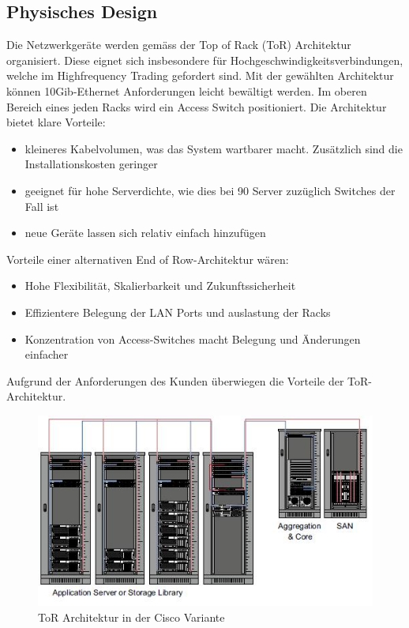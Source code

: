 \subsection{Physisches Design}
Die Netzwerkgeräte werden gemäss der Top of Rack (ToR) Architektur organisiert. Diese eignet sich insbesondere für Hochgeschwindigkeitsverbindungen, welche im Highfrequency Trading gefordert sind. Mit der gewählten Architektur können 10Gib-Ethernet Anforderungen leicht bewältigt werden. Im oberen Bereich eines jeden Racks wird ein Access Switch positioniert. Die Architektur bietet klare Vorteile:
\begin{itemize}
	\item kleineres Kabelvolumen, was das System wartbarer macht. Zusätzlich sind die Installationskosten geringer
	\item geeignet für hohe Serverdichte, wie dies bei 90 Server zuzüglich Switches der Fall ist
	\item neue Geräte lassen sich relativ einfach hinzufügen
\end{itemize}

Vorteile einer alternativen End of Row-Architektur wären:
\begin{itemize}
	\item Hohe Flexibilität, Skalierbarkeit und Zukunftssicherheit
	\item Effizientere Belegung der LAN Ports und auslastung der Racks
	\item Konzentration von Access-Switches macht Belegung und Änderungen einfacher
\end{itemize}

Aufgrund der Anforderungen des Kunden überwiegen die Vorteile der ToR-Architektur.

\begin{figure}[h]
\centering
\includegraphics[width=0.5\linewidth]{images/tor_architecture}
\caption{ToR Architektur in der Cisco Variante}
\label{fig:torarchitecture}
\end{figure}



